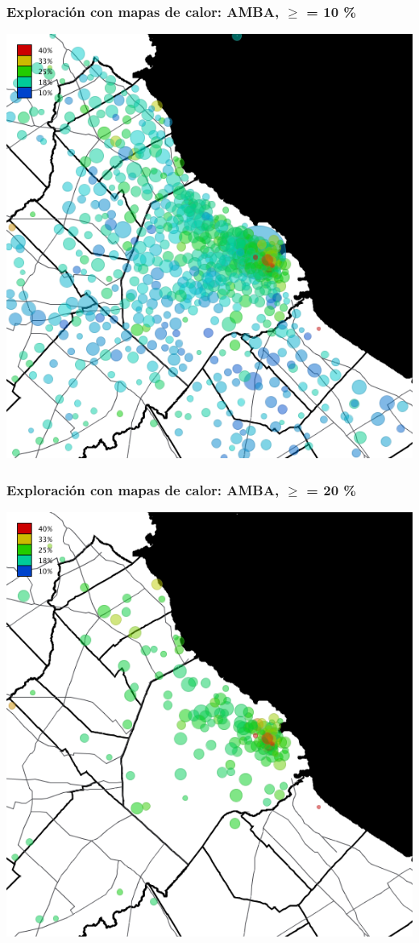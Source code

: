 \documentclass[xcolor=x11names]{beamer}
\begin{document}
\begin{frame}
	\frametitle{Exploración con mapas de calor: AMBA, $\geq$ = 10 \%}
	\centering
	\includegraphics[height=.9\textheight,width = .9\columnwidth,keepaspectratio]
	{slides/201112_hi_res_amba_usuarios_proporcion_circulos_beta10.png}
\end{frame}
\begin{frame}
	\frametitle{Exploración con mapas de calor: AMBA, $\geq$ = 20 \%}
	\centering
	\includegraphics[height=.9\textheight,width = .9\columnwidth,keepaspectratio]
	{slides/201112_hi_res_amba_usuarios_proporcion_circulos_beta20.png}
\end{frame}
\end{document}

